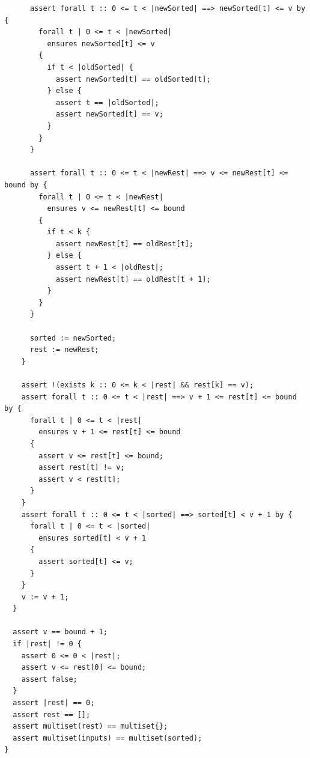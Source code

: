 \documentclass{article}
\begin{document}
\begin{lstlisting}
      assert forall t :: 0 <= t < |newSorted| ==> newSorted[t] <= v by {
        forall t | 0 <= t < |newSorted|
          ensures newSorted[t] <= v
        {
          if t < |oldSorted| {
            assert newSorted[t] == oldSorted[t];
          } else {
            assert t == |oldSorted|;
            assert newSorted[t] == v;
          }
        }
      }

      assert forall t :: 0 <= t < |newRest| ==> v <= newRest[t] <= bound by {
        forall t | 0 <= t < |newRest|
          ensures v <= newRest[t] <= bound
        {
          if t < k {
            assert newRest[t] == oldRest[t];
          } else {
            assert t + 1 < |oldRest|;
            assert newRest[t] == oldRest[t + 1];
          }
        }
      }

      sorted := newSorted;
      rest := newRest;
    }

    assert !(exists k :: 0 <= k < |rest| && rest[k] == v);
    assert forall t :: 0 <= t < |rest| ==> v + 1 <= rest[t] <= bound by {
      forall t | 0 <= t < |rest|
        ensures v + 1 <= rest[t] <= bound
      {
        assert v <= rest[t] <= bound;
        assert rest[t] != v;
        assert v < rest[t];
      }
    }
    assert forall t :: 0 <= t < |sorted| ==> sorted[t] < v + 1 by {
      forall t | 0 <= t < |sorted|
        ensures sorted[t] < v + 1
      {
        assert sorted[t] <= v;
      }
    }
    v := v + 1;
  }

  assert v == bound + 1;
  if |rest| != 0 {
    assert 0 <= 0 < |rest|;
    assert v <= rest[0] <= bound;
    assert false;
  }
  assert |rest| == 0;
  assert rest == [];
  assert multiset(rest) == multiset{};
  assert multiset(inputs) == multiset(sorted);
}
\end{lstlisting}
\end{document}
